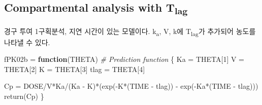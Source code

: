 \documentclass[
  11pt,
  krantz2, a4paper, twoside]{krantz}
\newenvironment{Shaded}{\begin{snugshade}}{\end{snugshade}}
\newcommand{\AttributeTok}[1]{\textcolor[rgb]{0.77,0.63,0.00}{#1}}
\newcommand{\CommentTok}[1]{\textcolor[rgb]{0.56,0.35,0.01}{\textit{#1}}}
\newcommand{\ControlFlowTok}[1]{\textcolor[rgb]{0.13,0.29,0.53}{\textbf{#1}}}
\newcommand{\DecValTok}[1]{\textcolor[rgb]{0.00,0.00,0.81}{#1}}
\newcommand{\FloatTok}[1]{\textcolor[rgb]{0.00,0.00,0.81}{#1}}
\newcommand{\FunctionTok}[1]{\textcolor[rgb]{0.00,0.00,0.00}{#1}}
\newcommand{\NormalTok}[1]{#1}
\newcommand{\OtherTok}[1]{\textcolor[rgb]{0.56,0.35,0.01}{#1}}
\newcommand{\SpecialCharTok}[1]{\textcolor[rgb]{0.00,0.00,0.00}{#1}}
\newcommand{\StringTok}[1]{\textcolor[rgb]{0.31,0.60,0.02}{#1}}
\theoremstyle{definition}
\theoremstyle{definition}
\theoremstyle{definition}
\theoremstyle{definition}
\theoremstyle{remark}
\begin{document}
\hypertarget{compartmental-analysis-with-tlag}{%
\subsection{\texorpdfstring{Compartmental analysis with T\textsubscript{lag}}{Compartmental analysis with Tlag}}\label{compartmental-analysis-with-tlag}}

경구 투여 1구획분석, 지연 시간이 있는 모델이다. k\textsubscript{a}, V, k에 T\textsubscript{lag}가 추가되어 농도를 나타낼 수 있다.

\small

\begin{Shaded}
\begin{Highlighting}[]
\NormalTok{fPK02b }\OtherTok{=} \ControlFlowTok{function}\NormalTok{(THETA) }\CommentTok{\# Prediction function}
\NormalTok{\{}
\NormalTok{  Ka   }\OtherTok{=}\NormalTok{ THETA[}\DecValTok{1}\NormalTok{]}
\NormalTok{  V    }\OtherTok{=}\NormalTok{ THETA[}\DecValTok{2}\NormalTok{]}
\NormalTok{  K    }\OtherTok{=}\NormalTok{ THETA[}\DecValTok{3}\NormalTok{]}
\NormalTok{  tlag }\OtherTok{=}\NormalTok{ THETA[}\DecValTok{4}\NormalTok{]}

\NormalTok{  Cp  }\OtherTok{=}\NormalTok{ DOSE}\SpecialCharTok{/}\NormalTok{V}\SpecialCharTok{*}\NormalTok{Ka}\SpecialCharTok{/}\NormalTok{(Ka }\SpecialCharTok{{-}}\NormalTok{ K)}\SpecialCharTok{*}\NormalTok{(}\FunctionTok{exp}\NormalTok{(}\SpecialCharTok{{-}}\NormalTok{K}\SpecialCharTok{*}\NormalTok{(TIME }\SpecialCharTok{{-}}\NormalTok{ tlag)) }\SpecialCharTok{{-}} \FunctionTok{exp}\NormalTok{(}\SpecialCharTok{{-}}\NormalTok{Ka}\SpecialCharTok{*}\NormalTok{(TIME }\SpecialCharTok{{-}}\NormalTok{ tlag))) }
  \FunctionTok{return}\NormalTok{(Cp)}
\NormalTok{\}}
\end{Highlighting}
\end{Shaded}

\begin{Shaded}
\end{Shaded}
\end{document}
